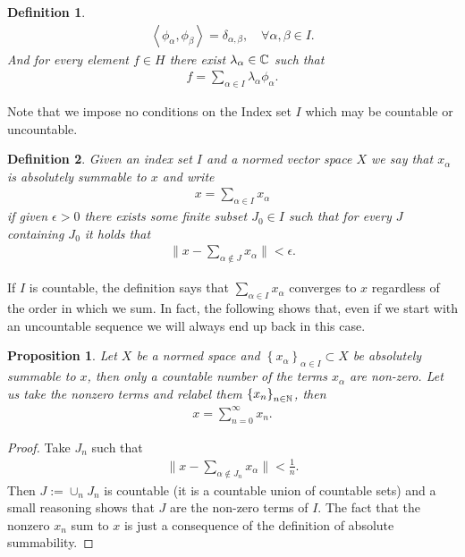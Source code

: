 \documentclass[12pt]{article}
\newtheorem{proposition}{Proposition}
\newtheorem{definition}{Definition}
\newcommand{\br}[1]{\left\langle#1\right\rangle} \newcommand{\set}[1]{\left\{#1\right\}}\newcommand{\qt}[1]{\left(#1\right)} \newcommand{\qp}[1]{\left(#1\right)}\newcommand{\qb}[1]{\left[#1\right]}
\renewcommand{\norm}[1]{\lVert #1 \rVert}\renewcommand{\abs}[1]{\left| #1 \right|}
\begin{document}
\begin{CJK*}{UTF8}{gbsn}
\begin{definition}
		\begin{align*}
			\br{\phi_\alpha,\phi_\beta }= \delta _{\alpha, \beta }, \quad\forall \alpha,\beta \in I.
		\end{align*}
		And for every element $f \in H$ there exist $\lambda _\alpha \in  \mathbb{C}$ such that
		\begin{align}\label{sum}
			f= \sum_{\alpha \in I} \lambda _\alpha \phi_\alpha .
		\end{align}
	\end{definition}
	Note that we impose no conditions on the Index set $I$ which may be countable or uncountable.
	\begin{definition}
		Given an index set $I$ and a normed vector space $X$ we say that $x_\alpha$ is absolutely summable to $x$ and write
		\begin{align*}
			x= \sum_{\alpha\in I}x_\alpha
		\end{align*}
		if given $\epsilon >0$ there exists some finite subset $J_0 \in I$ such that for every $J$ containing  $J_0$ it holds that
		\begin{align*}
			\norm{x-\sum_{\alpha\notin J} x_\alpha}<\epsilon  .
		\end{align*}
	\end{definition}
	If $I$ is countable, the definition says that $\sum_{\alpha \in I} x_\alpha$ converges to $x$ regardless of the order in which we sum. In fact, the following shows that, even if we start with an uncountable sequence we will always end up back in this case.
	\begin{proposition}
		Let $X$  be a normed space and $\set{x_\alpha}_{\alpha \in I} \subset  X$ be absolutely summable to $x$, then only a countable number of the terms $x_\alpha$ are non-zero. Let us take the nonzero terms and relabel them $\set{x_n}_{n \in \N} $, then\begin{align*}
			x= \sum_{n=0}^{\infty} x_n.
		\end{align*}
	\end{proposition}
	\begin{proof}
		Take $J_n$ such that
		\begin{align*}
			\norm{x-\sum_{ \alpha \notin J_n} x_\alpha}< \frac{1}{n}   .
		\end{align*}
		Then $J:= \cup_n J_n$ is countable (it is a countable union of countable sets) and a small reasoning shows that $J $ are the non-zero terms of $I$. The fact that the nonzero $x_n$ sum to  $x$ is just a consequence of the definition of absolute summability.
	\end{proof}

\end{CJK*}
\end{document}
